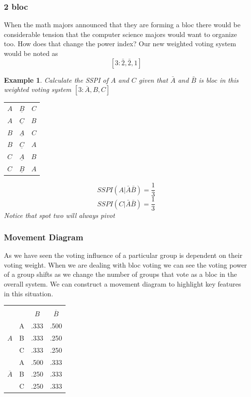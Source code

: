\documentclass[12pt]{article}
\newtheorem{example}[theorem]{Example}
\begin{document}
\subsubsection{2 bloc}
When the math majors announced that they are forming a bloc there would be considerable tension that the computer science majors would want to organize too. How does that change the power index?
Our new weighted voting system would be noted as $$[3:\bar{2},\bar{2},1]$$ 
\begin{example}\label{2}
Calculate the SSPI of $A$ and $C$ given that $\bar{A}$ and $\bar{B}$ is bloc in this weighted voting system $[3:\bar{A},B,C]$ 
\begin{center}
\begin{tabular}{ l c r }
  $A$ & $\underline{B}$ & $C$\\ 
  $A$ & $\underline{C}$ & $B$\\
  $B$ & $\underline{A}$ & $C$\\
  $B$ & $\underline{C}$ & $A$\\
  $C$ & $\underline{A}$ & $B$\\
  $C$ & $\underline{B}$ & $A$\\
\end{tabular}
\end{center}
\begin{equation}
SSPI(A|\bar{A}\bar{B}) = \frac{1}{3}
\end{equation}
\begin{equation}
SSPI(C|\bar{A}\bar{B}) = \frac{1}{3}
\end{equation}
Notice that spot two will always pivot 
\end{example}



\subsubsection{Movement Diagram}
As we have seen the voting influence of a particular group is dependent on their voting weight. When we are dealing with bloc voting we can see the voting power of a group shifts as we change the number of groups that vote as a bloc in the overall system. We can construct a movement diagram to highlight key features in this situation.
\begin{center}
\begin{tabular}{| c | c | c | c |} \hline
         &  &     &           \\
         &  & $B$ & $\overline{B}$ \\ \hline
                &A &.333 &  .500     \\
$A$           &B &.333 &  .250     \\
                &C &.333  & .250     \\ \hline
                &A &.500 &  .333    \\
$\overline{A}$&B &.250 &  .333     \\
                &C &.250 & .333     \\ \hline
\end{tabular}
\end{center}
\end{document}
